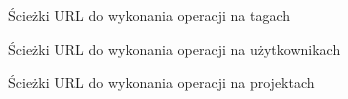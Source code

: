 \bigskip
\bigskip
\bigskip
\bigskip
\bigskip
\bigskip
\bigskip
\bigskip
\bigskip
\bigskip
\bigskip\bigskip
\bigskip\bigskip
\bigskip\bigskip
\bigskip\bigskip
\bigskip


\begin{figure}[h!]
	\caption{Ścieżki URL do wykonania operacji na tagach}
	\centering
\end{figure}



\begin{figure}[h!]
	\caption{Ścieżki URL do wykonania operacji na użytkownikach}
	\centering
\end{figure}


\begin{figure}[h!]
	\caption{Ścieżki URL do wykonania operacji na projektach}
	\centering
\end{figure}


